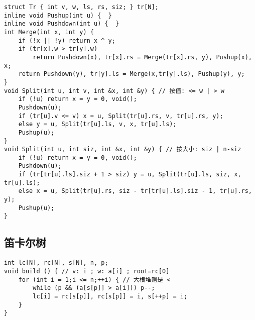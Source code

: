 \documentclass[a4paper,landscape,twocolumn]{ctexart}
\begin{document}
\begin{lstlisting}
struct Tr { int v, w, ls, rs, siz; } tr[N];
inline void Pushup(int u) {  }
inline void Pushdown(int u) {  }
int Merge(int x, int y) {
	if (!x || !y) return x ^ y;
	if (tr[x].w > tr[y].w)
		return Pushdown(x), tr[x].rs = Merge(tr[x].rs, y), Pushup(x), x;
	return Pushdown(y), tr[y].ls = Merge(x,tr[y].ls), Pushup(y), y;
}
void Split(int u, int v, int &x, int &y) { // 按值: <= w | > w
	if (!u) return x = y = 0, void();
	Pushdown(u);
	if (tr[u].v <= v) x = u, Split(tr[u].rs, v, tr[u].rs, y);
	else y = u, Split(tr[u].ls, v, x, tr[u].ls);
	Pushup(u);
}
void Split(int u, int siz, int &x, int &y) { // 按大小: siz | n-siz
	if (!u) return x = y = 0, void();
	Pushdown(u);
	if (tr[tr[u].ls].siz + 1 > siz) y = u, Split(tr[u].ls, siz, x, tr[u].ls);
	else x = u, Split(tr[u].rs, siz - tr[tr[u].ls].siz - 1, tr[u].rs, y);
	Pushup(u);
}
\end{lstlisting}

\subsection{笛卡尔树}

\begin{lstlisting}
int lc[N], rc[N], s[N], n, p;
void build () { // v: i ; w: a[i] ; root=rc[0]
	for (int i = 1;i <= n;++i) { // 大根堆则是 <
		while (p && (a[s[p]] > a[i])) p--;
		lc[i] = rc[s[p]], rc[s[p]] = i, s[++p] = i;
	}
}
\end{lstlisting}

%
%
\end{document}
